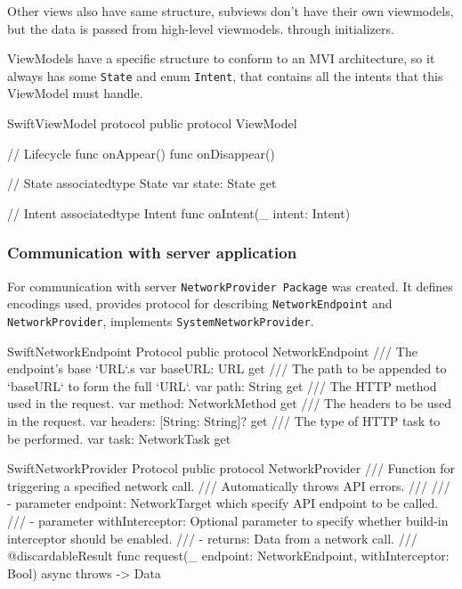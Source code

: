 \documentclass[
  biblatex = false,
  language=english,
  figures=false,
  sourcecodes,
  glossaries,
  index
]{kidiplom}
\begin{document}
Other views also have same structure, subviews don't have their own viewmodels, but the data is passed from high-level viewmodels. through initializers.

ViewModels have a specific structure to conform to an MVI architecture, so it always has some \texttt{State} and enum \texttt{Intent}, that contains all the intents that this ViewModel must handle.

\begin{kicode}{Swift}{}{ViewModel protocol}
public protocol ViewModel {
    // Lifecycle
    func onAppear()
    func onDisappear()
    
    // State
    associatedtype State
    var state: State { get }
    
    // Intent
    associatedtype Intent
    func onIntent(_ intent: Intent)
}
\end{kicode}

\subsubsection{Communication with server application}
For communication with server \texttt{NetworkProvider Package} was created. It defines encodings used, provides protocol for describing \texttt{NetworkEndpoint} and \texttt{NetworkProvider}, implements \texttt{SystemNetworkProvider}.

\begin{kicode}{Swift}{}{NetworkEndpoint Protocol}
public protocol NetworkEndpoint {
    /// The endpoint's base `URL`.s
    var baseURL: URL { get }
    /// The path to be appended to `baseURL` to form the full `URL`.
    var path: String { get }
    /// The HTTP method used in the request.
    var method: NetworkMethod { get }
    /// The headers to be used in the request.
    var headers: [String: String]? { get }
    /// The type of HTTP task to be performed.
    var task: NetworkTask { get }
}
\end{kicode}

\begin{kicode}{Swift}{}{NetworkProvider Protocol}
public protocol NetworkProvider {   
    /// Function for triggering a specified network call.
    /// Automatically throws API errors.
    ///
    /// - parameter endpoint: NetworkTarget which specify API endpoint to be called.
    /// - parameter withInterceptor: Optional parameter to specify whether build-in interceptor should be enabled.
    /// - returns: Data from a network call.
    ///
    @discardableResult
    func request(_ endpoint: NetworkEndpoint, withInterceptor: Bool) async throws -> Data
}
\end{kicode}
\end{document}
